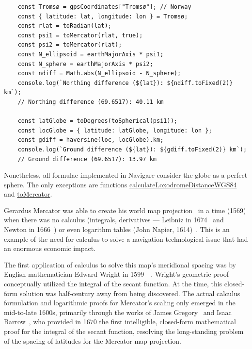 \documentclass[onecolumn,3p]{elsarticle}
\begin{document}
\begin{lstlisting}
    const Tromsø = gpsCoordinates["Tromsø"]; // Norway
    const { latitude: lat, longitude: lon } = Tromsø;
    const rlat = toRadian(lat);
    const psi1 = toMercator(rlat, true);
    const psi2 = toMercator(rlat);
    const N_ellipsoid = earthMajorAxis * psi1;
    const N_sphere = earthMajorAxis * psi2;
    const ndiff = Math.abs(N_ellipsoid - N_sphere);
    console.log(`Northing difference (${lat}): ${ndiff.toFixed(2)} km`);
    // Northing difference (69.6517): 40.11 km

    const latGlobe = toDegrees(toSpherical(psi1));
    const locGlobe = { latitude: latGlobe, longitude: lon };
    const gdiff = haversine(loc, locGlobe).km;
    console.log(`Ground difference (${lat}): ${gdiff.toFixed(2)} km`);
    // Ground difference (69.6517): 13.97 km
\end{lstlisting}

\vspace{0.5cm}
Nonetheless, all formulae implemented in Navigare consider the globe as a perfect sphere.
The only exceptions are functions
\href{https://krotalias.github.io/cwdc/13-webgl/extras/doc-light/global.html#calculateLoxodromeDistanceWGS84}{calculateLoxodromeDistanceWGS84}
and \href{https://krotalias.github.io/cwdc/13-webgl/extras/doc-light/global.html#toMercator}{toMercator}.

Gerardus Mercator was able to create his world map projection~\cite{Mercator1569Nova}
in a time (1569) when there was no calculus
(integrals, derivatives — Leibniz in 1674~\cite{Leibniz1684} and Newton in 1666~\cite{Newton1967Whiteside}) or
even logarithm tables (John Napier, 1614)~\cite{Napier1614}.
This is an example of the need for calculus to solve a navigation technological issue
that had an enormous economic impact.

The first application of calculus to solve this
map's meridional spacing was by English mathematician Edward Wright
in 1599~\cite{wright1599errors}~\cite{wright1610errors}.
Wright's geometric proof conceptually utilized the integral of the secant function.
At the time, this closed-form solution was half-century away from being discovered.
The actual calculus formulation and logarithmic proofs for Mercator's scaling only
emerged in the mid-to-late 1600s, primarily through the works of James Gregory~\cite{Gregory1668}
and Isaac Barrow~\cite{Barrow1670}, who provided in 1670 the first intelligible,
closed-form mathematical proof for the integral of the secant function,
resolving the long-standing problem of the spacing of latitudes for the Mercator map projection.
\end{document}
